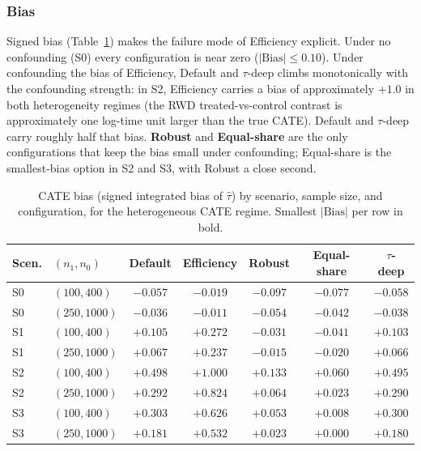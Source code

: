 \documentclass[11pt]{article}
\theoremstyle{plain}
\theoremstyle{definition}
\theoremstyle{remark}
\newcommand{\1}{\mathds{1}}
\begin{document}
\subsubsection*{Bias}

Signed bias (Table~\ref{tab:sim-prior-bias-het}) makes the failure mode
of Efficiency explicit. Under no confounding (S0) every configuration is
near zero ($|\mathrm{Bias}|\leq 0.10$). Under confounding the bias of
Efficiency, Default and $\tau$-deep climbs monotonically with the
confounding strength: in S2, Efficiency carries a bias of approximately
$+1.0$ in both heterogeneity regimes (the RWD treated-vs-control
contrast is approximately one log-time unit larger than the true CATE).
Default and $\tau$-deep carry roughly half that bias. \textbf{Robust}
and \textbf{Equal-share} are the only configurations that keep the bias
small under confounding; Equal-share is the smallest-bias option in S2
and S3, with Robust a close second.

\begin{table}[tb]
\centering
\small
\caption{CATE bias (signed integrated bias of $\hat\tau$) by scenario,
sample size, and configuration, for the heterogeneous CATE regime.
Smallest $|\mathrm{Bias}|$ per row in bold.}
\label{tab:sim-prior-bias-het}
\begin{tabular}{llccccc}
\toprule
Scen. & $(n_1, n_0)$  & Default & Efficiency       & Robust            & Equal-share        & $\tau$-deep \\
\midrule
S0    & $(100, 400)$  & $-0.057$ & \textbf{$-0.019$} & $-0.097$         & $-0.077$           & $-0.058$    \\
S0    & $(250, 1000)$ & $-0.036$ & \textbf{$-0.011$} & $-0.054$         & $-0.042$           & $-0.038$    \\
\midrule
S1    & $(100, 400)$  & $+0.105$ & $+0.272$         & \textbf{$-0.031$} & $-0.041$           & $+0.103$    \\
S1    & $(250, 1000)$ & $+0.067$ & $+0.237$         & \textbf{$-0.015$} & $-0.020$           & $+0.066$    \\
\midrule
S2    & $(100, 400)$  & $+0.498$ & $+1.000$         & $+0.133$          & \textbf{$+0.060$}  & $+0.495$    \\
S2    & $(250, 1000)$ & $+0.292$ & $+0.824$         & $+0.064$          & \textbf{$+0.023$}  & $+0.290$    \\
\midrule
S3    & $(100, 400)$  & $+0.303$ & $+0.626$         & $+0.053$          & \textbf{$+0.008$}  & $+0.300$    \\
S3    & $(250, 1000)$ & $+0.181$ & $+0.532$         & $+0.023$          & \textbf{$+0.000$}  & $+0.180$    \\
\bottomrule
\end{tabular}
\end{table}
\end{document}
